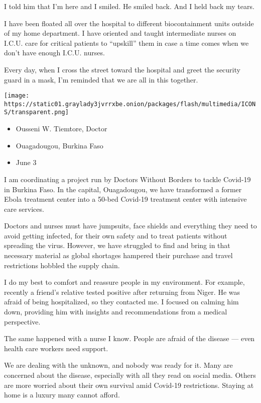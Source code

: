 I told him that I'm here and I smiled. He smiled back. And I held back
my tears.

I have been floated all over the hospital to different biocontainment
units outside of my home department. I have oriented and taught
intermediate nurses on I.C.U. care for critical patients to ``upskill''
them in case a time comes when we don't have enough I.C.U. nurses.

Every day, when I cross the street toward the hospital and greet the
security guard in a mask, I'm reminded that we are all in this together.

\texttt{[image: https://static01.graylady3jvrrxbe.onion/packages/flash/multimedia/ICONS/transparent.png]}

\begin{itemize}
\tightlist
\item
  Ousseni W. Tiemtore, Doctor
\item
  Ouagadougou, Burkina Faso
\item
  June 3
\end{itemize}

I am coordinating a project run by Doctors Without Borders to tackle
Covid-19 in Burkina Faso. In the capital, Ouagadougou, we have
transformed a former Ebola treatment center into a 50-bed Covid-19
treatment center with intensive care services.

Doctors and nurses must have jumpsuits, face shields and everything they
need to avoid getting infected, for their own safety and to treat
patients without spreading the virus. However, we have struggled to find
and bring in that necessary material as global shortages hampered their
purchase and travel restrictions hobbled the supply chain.

I do my best to comfort and reassure people in my environment. For
example, recently a friend's relative tested positive after returning
from Niger. He was afraid of being hospitalized, so they contacted me. I
focused on calming him down, providing him with insights and
recommendations from a medical perspective.

The same happened with a nurse I know. People are afraid of the disease
--- even health care workers need support.

We are dealing with the unknown, and nobody was ready for it. Many are
concerned about the disease, especially with all they read on social
media. Others are more worried about their own survival amid Covid-19
restrictions. Staying at home is a luxury many cannot afford.

